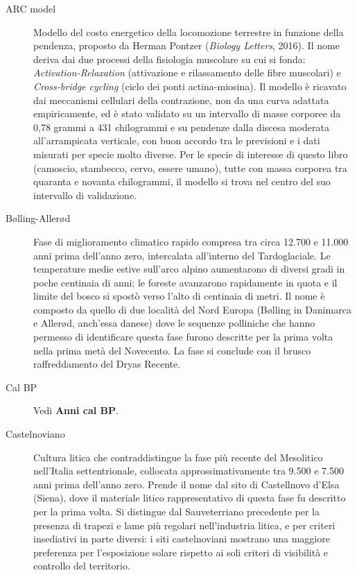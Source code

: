 \begin{description}
\item[ARC model] Modello del costo energetico della locomozione terrestre in funzione della pendenza, proposto da Herman Pontzer (\textit{Biology Letters}, 2016). Il nome deriva dai due processi della fisiologia muscolare su cui si fonda: \textit{Activation-Relaxation} (attivazione e rilassamento delle fibre muscolari) e \textit{Cross-bridge cycling} (ciclo dei ponti actina-miosina). Il modello è ricavato dai meccanismi cellulari della contrazione, non da una curva adattata empiricamente, ed è stato validato su un intervallo di masse corporee da 0,78 grammi a 431 chilogrammi e su pendenze dalla discesa moderata all'arrampicata verticale, con buon accordo tra le previsioni e i dati misurati per specie molto diverse. Per le specie di interesse di questo libro (camoscio, stambecco, cervo, essere umano), tutte con massa corporea tra quaranta e novanta chilogrammi, il modello si trova nel centro del suo intervallo di validazione.

\item[Bølling-Allerød] Fase di miglioramento climatico rapido compresa tra circa 12.700 e 11.000 anni prima dell'anno zero, intercalata all'interno del Tardoglaciale. Le temperature medie estive sull'arco alpino aumentarono di diversi gradi in poche centinaia di anni; le foreste avanzarono rapidamente in quota e il limite del bosco si spostò verso l'alto di centinaia di metri. Il nome è composto da quello di due località del Nord Europa (Bølling in Danimarca e Allerød, anch'essa danese) dove le sequenze polliniche che hanno permesso di identificare questa fase furono descritte per la prima volta nella prima metà del Novecento. La fase si conclude con il brusco raffreddamento del Dryas Recente.

\item[Cal BP] Vedi \textbf{Anni cal BP}.

\item[Castelnoviano] Cultura litica che contraddistingue la fase più recente del Mesolitico nell'Italia settentrionale, collocata approssimativamente tra 9.500 e 7.500 anni prima dell'anno zero. Prende il nome dal sito di Castellnovo d'Elsa (Siena), dove il materiale litico rappresentativo di questa fase fu descritto per la prima volta. Si distingue dal Sauveterriano precedente per la presenza di trapezi e lame più regolari nell'industria litica, e per criteri insediativi in parte diversi: i siti castelnoviani mostrano una maggiore preferenza per l'esposizione solare rispetto ai soli criteri di visibilità e controllo del territorio.


\end{description}
